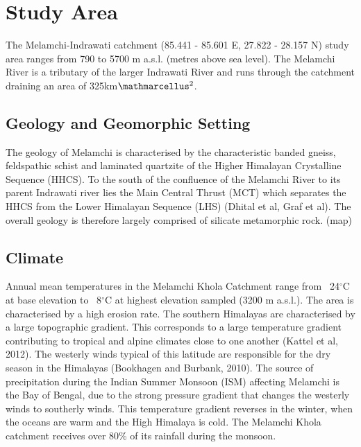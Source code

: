 
\section{Study Area}



The Melamchi-Indrawati catchment (85.441 - 85.601 E, 27.822 - 28.157 N) study area ranges from 790 to 5700 m a.s.l. (metres above sea level). The Melamchi River is a tributary of the larger Indrawati River and runs through the catchment draining an area of 325km$\ttmath{^2}$. 

\subsection{Geology and Geomorphic Setting}


The geology of Melamchi is characterised by the characteristic banded gneiss, feldspathic schist and laminated quartzite of the Higher Himalayan Crystalline Sequence (HHCS). To the south of the confluence of the Melamchi River to its parent Indrawati river lies the Main Central Thrust (MCT) which separates the HHCS from the Lower Himalayan Sequence (LHS) (Dhital et al, Graf et al). The overall geology is therefore largely comprised of silicate metamorphic rock. (map)

\subsection{Climate}

Annual mean temperatures in the Melamchi Khola Catchment range from ~24$^{\circ}$C at base elevation to ~8$^{\circ}$C at highest elevation sampled (3200 m a.s.l.). The area is characterised by a high erosion rate.  The southern Himalayas are characterised by a large topographic gradient. This corresponds to a large temperature gradient contributing to tropical and alpine climates close to one another (Kattel et al, 2012). The westerly winds typical of this latitude are responsible for the dry season in the Himalayas (Bookhagen and Burbank, 2010). The source of precipitation during the Indian Summer Monsoon (ISM) affecting Melamchi is the Bay of Bengal, due to the strong pressure gradient that changes the westerly winds to southerly winds. This temperature gradient reverses in the winter, when the oceans are warm and the High Himalaya is cold.  The Melamchi Khola catchment receives over 80\% of its rainfall during the monsoon.

